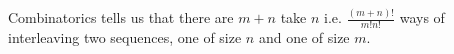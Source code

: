 Combinatorics tells us that there are $m + n$ take $n$ i.e. $\frac{(m + n)!}{m!n!}$ ways of interleaving two sequences, one of size $n$ and one of size $m$.
